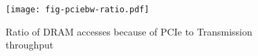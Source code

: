 \begin{figure}[t]
\texttt{[image: fig-pciebw-ratio.pdf]}
\caption{Ratio of DRAM accesses because of PCIe to Transmission throughput}
\label{fig:pciebw-ratio}
\end{figure}
